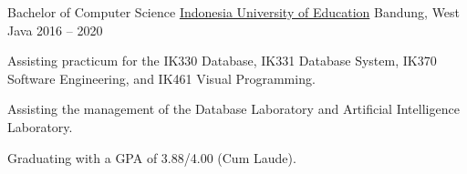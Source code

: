 


\begin{cventries}


\cventry
{Bachelor of Computer Science} %
{\href{https://www.upi.edu/}{Indonesia University of Education}} %
{Bandung, West Java} %
{2016 -- 2020} %
{ %
\begin{cvitems}
\item {Assisting practicum for the IK330 Database, IK331 Database System, IK370 Software Engineering, and IK461 Visual Programming.}
\item {Assisting the management of the Database Laboratory and Artificial Intelligence Laboratory.}
\item {Graduating with a GPA of 3.88/4.00 (Cum Laude).}
\end{cvitems}
}


\end{cventries}
